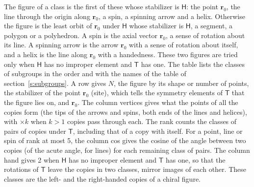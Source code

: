\documentclass[10pt,a4paper]{article}
\numberwithin{equation}{section}
\newcommand{\grp}[1]{\mathsf{#1}}
\newcommand{\pointr}{\mathbf{r}}
\begin{document}
\leavevmode\label{n:head.figure}The figure of a class is the first of these whose stabilizer is $\grp{H}$: the point $\pointr_0$, the line through the origin along $\pointr_0$, a spin, a spinning arrow and a helix. Otherwise the figure is the least orbit of $\pointr_0$ under $\grp{H}$ whose stabilizer is $\grp{H}$, a segment, a polygon or a polyhedron. A spin is the axial vector $\pointr_0$, a sense of rotation about its line. A spinning arrow is the arrow $\pointr_0$ with a sense of rotation about itself, and a helix is the line along $\pointr_0$ with a handedness. These two figures are tried only when $\grp{H}$ has no improper element and $\grp{T}$ has one. The table lists the classes of subgroups in the order and with the names of the table of section~\ref{s:subgroups}. \label{n:head.site}A row gives $N$, the figure by its shape or number of points, the stabilizer of the point $\pointr_0$ (site), which tells the symmetry elements of $\grp{T}$ that the figure lies on, and $\pointr_0$. \label{n:head.vertices}The column vertices gives what the points of all the copies form (the tips of the arrows and spins, both ends of the lines and helices), with ${\times}k$ when $k > 1$ copies pass through each. \label{n:head.rank}The rank counts the classes of pairs of copies under $\grp{T}$, including that of a copy with itself. \label{n:head.cos}For a point, line or spin of rank at most 5, the column cos gives the cosine of the angle between two copies (of the acute angle, for lines) for each remaining class of pairs. \label{n:head.hand}The column hand gives 2 when $\grp{H}$ has no improper element and $\grp{T}$ has one, so that the rotations of $\grp{T}$ leave the copies in two classes, mirror images of each other. These classes are the left- and the right-handed copies of a chiral figure.
\end{document}
